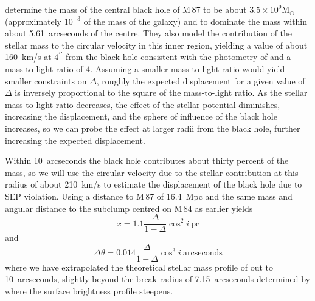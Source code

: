\documentclass[useAMS,usenatbib]{mn2e}
\newcommand{\msun}{\mathrm{M}_\odot}
\begin{document}
\citet{2013ApJ...770...86W} determine the mass of the central black
hole of M\,87 to be about $3.5 \times 10^{9} \msun$ (approximately
$10^{-3}$ of the mass of the galaxy) and to dominate the mass 
within about 5.61~arcseconds of the centre.  They also model the
contribution of the stellar mass to the circular velocity in this
inner region, yielding a value of about 160~km/s at $4^{\prime\prime}$
from the black hole consistent with the photometry of
\citet{2006ApJS..164..334F} and a mass-to-light ratio of 4. Assuming a
smaller mass-to-light ratio would yield smaller 
constraints 
on $\Delta$, roughly the expected displacement for a given value of
$\Delta$ is inversely proportional to the square of the mass-to-light
ratio.  As the stellar mass-to-light ratio decreases, the effect of
the stellar potential diminishes, increasing the displacement, and the
sphere of influence of the black hole increases, so we can probe the
effect at larger radii from the black hole, further increasing the
expected displacement.

Within 10~arcseconds the black hole contributes about thirty percent
of the mass, so we will use the circular velocity due to the stellar
contribution at this radius of about 210~km/s to estimate the
displacement of the black hole due to SEP violation.  Using a distance
to M\,87 of 16.4~Mpc \citep{2010A&A...524A..71B} and the same mass and
angular distance to the subclump centred on M\,84 as earlier yields
\begin{equation}
  x = 1.1 \frac{\Delta}{1-\Delta} \cos^2 i ~\mathrm{pc}
  \label{eq:14}
\end{equation}
and
\begin{equation}
    \Delta \theta = 0.014 \frac{\Delta}{1-\Delta} \cos^3 i~
    \mathrm{arcseconds}
    \label{eq:15}
\end{equation}
where we have extrapolated the theoretical stellar mass profile of
\citet{2013ApJ...770...86W} out to 10~arcseconds, slightly beyond the
break radius of 7.15~arcseconds determined by
\cite{2006ApJS..164..334F} where the surface brightness profile
steepens.

\end{document}
